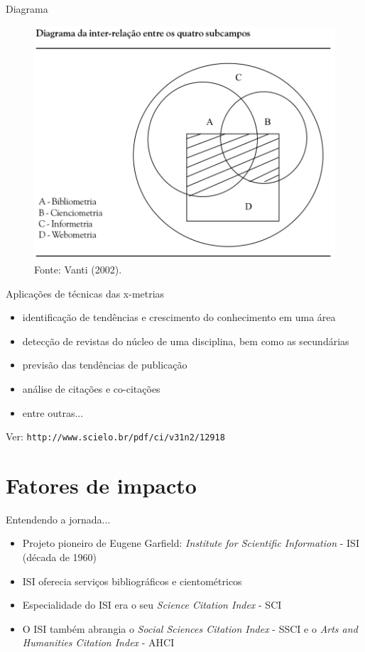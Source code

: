 \begin{frame}{Diagrama}
\begin{figure}
\centering
\includegraphics[scale=0.2]{figs/03/diagrama-metricas}
\caption{Fonte: Vanti (2002).}
\end{figure}
\end{frame}

\begin{frame}{Aplicações de técnicas das x-metrias}
\begin{itemize}
\item identificação de tendências e crescimento do conhecimento em uma área
\item detecção de revistas do núcleo de uma disciplina, bem como as secundárias 
\item previsão das tendências de publicação
\item análise de citações e co-citações 
\item entre outras... 
\end{itemize}
Ver: \texttt{http://www.scielo.br/pdf/ci/v31n2/12918}
\end{frame}

\section{Fatores de impacto}

\begin{frame}{Entendendo a jornada...}
\begin{itemize}
\item Projeto pioneiro de Eugene Garfield: \emph{Institute for Scientific Information} - ISI (década de 1960) 
\item ISI oferecia serviços bibliográficos e cientométricos 
\item Especialidade do ISI era o seu \emph{Science Citation Index} - SCI
\item O ISI também abrangia o \emph{Social Sciences Citation Index} - SSCI e o \emph{Arts and Humanities Citation Index} - AHCI
\end{itemize}
\end{frame}

